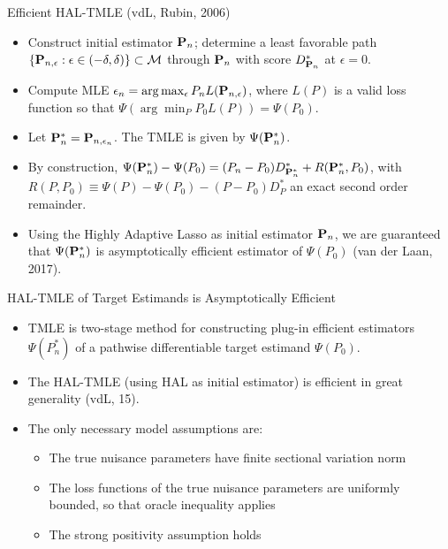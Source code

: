 \documentclass[t]{beamer}
\begin{document}
\begin{frame}{Efficient HAL-TMLE (vdL, Rubin, 2006)}
\begin{itemize}
\item Construct initial estimator ${\bf P}_n$; determine a least favorable path $\{{\bf P}_{n,\epsilon}:\epsilon\in (-\delta,\delta)\}\subset {\cal M}$ through ${\bf P}_n$ with score $D^*_{{\bf P}_n}$ at $\epsilon =0$.
\item Compute MLE $\epsilon_n =\arg\max_{\epsilon}P_n L({\bf P}_{n,\epsilon})$, where $L(P)$ is a valid loss function so that $\Psi(\arg\min_P P_0L(P))=\Psi(P_0)$.
\item Let ${\bf P}_n^*={\bf P}_{n,\epsilon_n}$. The TMLE is given by $\Psi({\bf P}_n^*)$.
\item By construction, $\Psi({\bf P}_n^*)-\Psi(P_0)=(P_n-P_0)D^*_{{\bf P}_n^*}+R({\bf P}_n^*,P_0)$, with $R(P,P_0)\equiv \Psi(P)-\Psi(P_0)-(P-P_0)D^*_P$ an exact second order remainder.
\item Using the Highly Adaptive Lasso as initial estimator ${\bf P}_n$, we are guaranteed that $\Psi({\bf P}_n^*)$ is asymptotically efficient estimator of $\Psi(P_0)$ (van der Laan, 2017).
\end{itemize}
\end{frame}

\begin{frame}{HAL-TMLE of Target Estimands is Asymptotically Efficient}
\begin{itemize}
\item TMLE is two-stage method for constructing plug-in efficient estimators $\Psi(P_n^*)$ of  a pathwise differentiable target estimand $\Psi(P_0)$.
\item
The HAL-TMLE (using HAL as initial estimator) is efficient in great generality (vdL, 15).
\item  The only necessary model assumptions are:
\begin{itemize}
\item The true nuisance parameters have finite sectional variation norm
\item The loss functions of the true nuisance parameters are uniformly bounded, so that oracle inequality applies
\item The strong positivity assumption holds
\end{itemize}
\end{itemize}
\end{frame}
\end{document}
